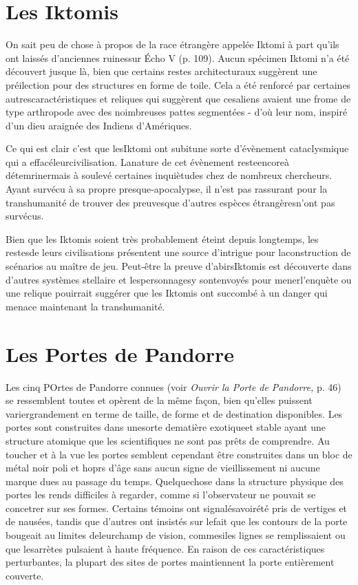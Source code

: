 {\section{Les Iktomis} 

On sait peu de chose à propos de la race étrangère appelée Iktomi à part qu'ils ont laissés d'anciennes ruinessur Écho V (p. 109). Aucun spécimen Iktomi n'a été découvert jusque là, bien que certains restes architecturaux suggèrent une préilection pour des structures en forme de toile. Cela a été renforcé par certaines autrescaractéristiques et reliques qui suggèrent que cesaliens avaient une frome de type arthropode avec des noimbreuses pattes segmentées - d'où leur nom, inspiré d'un dieu araignée des Indiens d'Amériques. 

Ce qui est clair c'est que lesIktomi ont subitune sorte d'évènement cataclysmique qui a effacéleurcivilisation. Lanature de cet évènement resteencoreà détemrinermais à soulevé certaines inquiètudes chez de nombreux chercheurs. Ayant survécu à sa propre presque-apocalypse, il n'est pas rassurant pour la transhumanité de trouver des preuvesque d'autres espèces étrangèresn'ont pas survécus. 

Bien que les Iktomis soient très probablement éteint depuis longtemps, les restesde leurs civilisations présentent une source d'intrigue pour laconstruction de scénarios au maître de jeu. Peut-être la preuve d'abirsIktomis est découverte dans d'autres systèmes stellaire et lespersonnagesy sontenvoyés pour menerl'enquète ou une relique pouirrait suggérer que les Iktomis ont succombé à un danger qui menace maintenant la transhumanité. 

\section{Les Portes de Pandorre} 

Les cinq POrtes de Pandorre connues (voir \textit{Ouvrir la Porte de } \textit{Pandorre,} p. 46) se ressemblent toutes et opèrent de la même façon, bien qu'elles puissent variergrandement en terme de taille, de forme et de destination disponibles. Les portes sont construites dans unesorte dematière exotiqueet stable ayant une structure atomique que les scientifiques ne sont pas prêts de comprendre. Au toucher et à la vue les portes semblent cependant être construites dans un bloc de métal noir poli et hoprs d'âge sans aucun signe de vieillissement ni aucune marque dues au passage du temps. Quelquechose dans la structure physique des portes les rends difficiles à regarder, comme si l'observateur ne pouvait se concetrer sur ses formes. Certains témoins ont signalésavoirété pris de vertiges et de nausées, tandis que d'autres ont insistés sur lefait que les contours de la porte bougeait au limites deleurchamp de vision, commesiles lignes se remplissaient ou que lesarrètes pulsaient à haute fréquence. En raison de ces caractéristiques perturbantes, la plupart des sites de portes maintiennent la porte entièrement couverte. 

}
